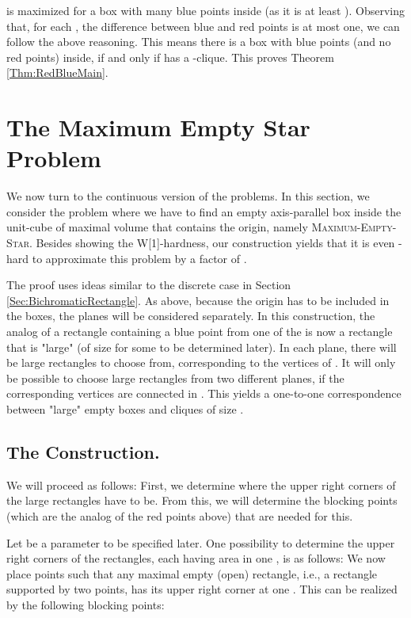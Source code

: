 \documentclass[12pt]{article}
\begin{document}
is maximized for a box with many blue points inside (as it is at least ). Observing that, for each , the difference between blue and red points is at most one, we can follow the above reasoning. This means there is a box with  blue points (and no red points) inside, if and only if  has a -clique. This proves Theorem \ref{Thm:RedBlueMain}.




\section{The Maximum Empty Star Problem}\label{Sec:MaximumEmptyStar}
We now turn to the continuous version of the problems. In this section, we consider the problem where we have to find an empty axis-parallel box inside the unit-cube of maximal volume that contains the origin, namely \textsc{Maximum-Empty-Star}.
Besides showing the W[1]-hardness, our construction yields that it is even -hard to approximate this problem by a factor of .

The proof uses ideas similar to the discrete case in Section \ref{Sec:BichromaticRectangle}. As above, because the origin has to be included in the boxes, the planes will be considered separately. In this construction, the analog of a rectangle containing a blue point from one of the  is now a rectangle that is "large" (of size  for some  to be determined later). In each plane, there will be  large rectangles to choose from, corresponding to the  vertices of . It will only be possible to choose large rectangles from two different planes, if the corresponding vertices are connected in . This yields a one-to-one correspondence between "large" empty boxes and cliques of size .

\subsection{The Construction.}

We will proceed as follows: First, we determine where the upper right
corners of the  large rectangles have to be. From this, we will
determine the blocking points (which are the analog of the red points
above) that are needed for this.

Let  be a parameter to be specified later. One possibility to
determine the upper right corners of the rectangles, each having area  in one , is as follows:
 We now place points such that any maximal empty (open)
rectangle, i.e., a rectangle supported by two points, has its upper right
corner at one .  This can be realized by the following
blocking points:
\end{document}

